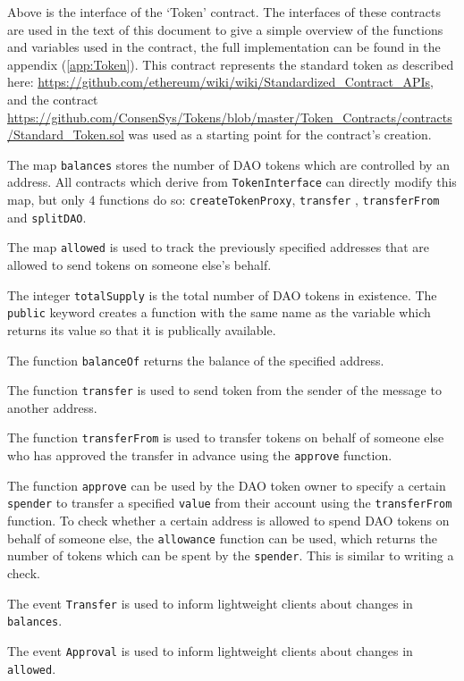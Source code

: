 \documentclass[9pt,oneside]{amsart}
\begin{document}
\begin{multicols}{2}

Above is the interface of the ‘Token’ contract. The interfaces of these contracts are used in the text of this document to give a simple overview of the functions and variables used in the contract, the full implementation can be found in the appendix (\ref{app:Token}). This contract represents the standard token as described here:
\url{https://github.com/ethereum/wiki/wiki/Standardized_Contract_APIs}, and the contract \url{https://github.com/ConsenSys/Tokens/blob/master/Token_Contracts/contracts/Standard_Token.sol} was used as a starting point for the contract’s creation.

The map \verb|balances| stores the number of DAO tokens which are controlled by an address. All contracts which derive from \verb|TokenInterface| can directly modify this map, but only $4$ functions do so: \verb|createTokenProxy|, \verb|transfer| , \verb|transferFrom| and \verb|splitDAO|.

The map \verb|allowed| is used to track the previously specified addresses that are allowed to send tokens on someone else's behalf.

The integer \verb|totalSupply| is the total number of DAO tokens in existence. The \verb|public| keyword creates a function with the same name as the variable which returns its value so that it is publically available.

The function \verb|balanceOf| returns the balance of the specified address. 

The function \verb|transfer| is used to send token from the sender of the message to another address.

The function \verb|transferFrom| is used to transfer tokens on behalf of someone else who has approved the transfer in advance using the \verb|approve| function.

The function \verb|approve| can be used by the DAO token owner to specify a certain \verb|spender| to transfer a specified \verb|value| from their account using the \verb|transferFrom| function. To check whether a certain address is allowed to spend DAO tokens on behalf of someone else, the \verb|allowance| function can be used, which returns the number of tokens which can be spent by the \verb|spender|. This is similar to writing a check.

The event \verb|Transfer| is used to inform lightweight clients about changes in \verb|balances|.

The event \verb|Approval| is used to inform lightweight clients about changes in \verb|allowed|.
\end{multicols}
\end{document}
